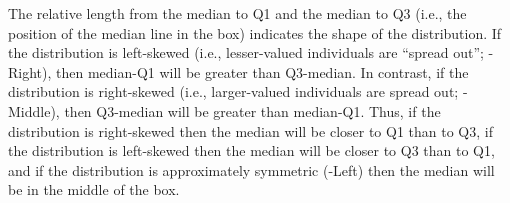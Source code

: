 \vspace{-12pt}

The relative length from the median to Q1 and the median to Q3 (i.e., the position of the median line in the box) indicates the shape of the distribution.  If the distribution is left-skewed (i.e., lesser-valued individuals are ``spread out''; -Right), then median-Q1 will be greater than Q3-median. In contrast, if the distribution is right-skewed (i.e., larger-valued individuals are spread out; -Middle), then Q3-median will be greater than median-Q1. Thus, if the distribution is right-skewed then the median will be closer to Q1 than to Q3, if the distribution is left-skewed then the median will be closer to Q3 than to Q1, and if the distribution is approximately symmetric (-Left) then the median will be in the middle of the box.

